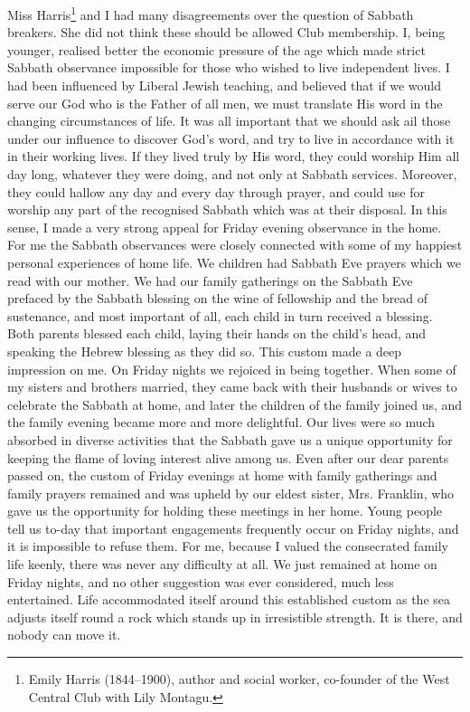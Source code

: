 \documentclass[14pt, article, extrafontsizes, twopage, a4paper]{memoir}
\begin{document}
Miss Harris\footnote{Emily Harris (1844--1900), author and social worker, co-founder of the West Central Club with Lily Montagu.} and I had many disagreements over the
question of Sabbath breakers. She did not think these
should be allowed Club membership. I, being younger,
realised better the economic pressure of the age which
made strict Sabbath observance impossible for those who
wished to live independent lives. I had been influenced
by Liberal Jewish teaching, and believed that if we would
serve our God who is the Father of all men, we must
translate His word in the changing circumstances of life.
It was all important that we should ask ail those under
our influence to discover God’s word, and try to live in
accordance with it in their working lives. If they lived
truly by His word, they could worship Him all day long,
whatever they were doing, and not only at Sabbath services.
Moreover, they could hallow any day and every
day through prayer, and could use for worship any part
of the recognised Sabbath which was at their disposal.
In this sense, I made a very strong appeal for Friday
evening observance in the home. For me the Sabbath
observances were closely connected with some of my
happiest personal experiences of home life. We children
had Sabbath Eve prayers which we read with our
mother. We had our family gatherings on the Sabbath
Eve prefaced by the Sabbath blessing on the wine of
fellowship and the bread of sustenance, and most important
of all, each child in turn received a blessing. Both
parents blessed each child, laying their hands on the
child’s head, and speaking the Hebrew blessing as they did
so. This custom made a deep impression on me. On
Friday nights we rejoiced in being together. When some
of my sisters and brothers married, they came back with
their husbands or wives to celebrate the Sabbath at home,
and later the children of the family joined us, and the
family evening became more and more delightful. Our
lives were so much absorbed in diverse activities that the
Sabbath gave us a unique opportunity for keeping the
flame of loving interest alive among us. Even after our
dear parents passed on, the custom of Friday evenings
at home with family gatherings and family prayers
remained and was upheld by our eldest sister, Mrs.
Franklin, who gave us the opportunity for holding these
meetings in her home. Young people tell us to-day that
important engagements frequently occur on Friday
nights, and it is impossible to refuse them. For me,
because I valued the consecrated family life keenly, there
was never any difficulty at all. We just remained at home
on Friday nights, and no other suggestion was ever considered,
much less entertained. Life accommodated itself
around this established custom as the sea adjusts itself
round a rock which stands up in irresistible strength. It
is there, and nobody can move it.
\end{document}
